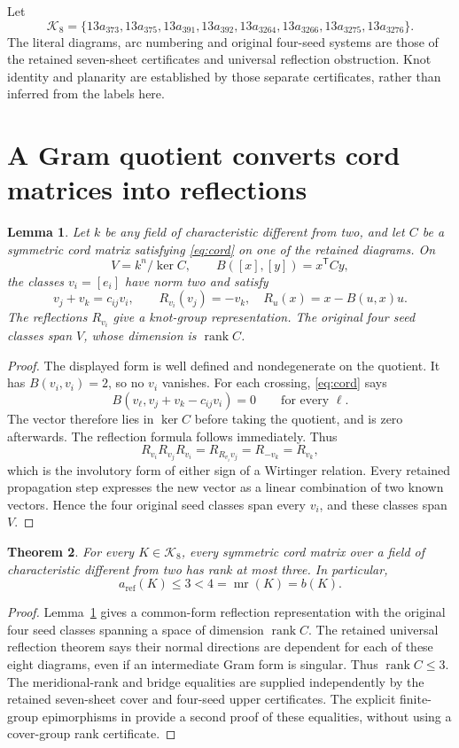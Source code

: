 \documentclass[11pt]{article}
\newtheorem{theorem}{Theorem}
\newtheorem{lemma}[theorem]{Lemma}
\newcommand{\mr}{\operatorname{mr}}
\newcommand{\rank}{\operatorname{rank}}
\begin{document}
Let
\[
\mathcal K_8=\{13a_{373},13a_{375},13a_{391},13a_{392},
13a_{3264},13a_{3266},13a_{3275},13a_{3276}\}.
\]
The literal diagrams, arc numbering and original four-seed systems are
those of the retained seven-sheet certificates and universal reflection
obstruction. Knot identity and planarity are established by those
separate certificates, rather than inferred from the labels here.

\section{A Gram quotient converts cord matrices into reflections}

\begin{lemma}\label{lem:gram}
Let $k$ be any field of characteristic different from two, and let $C$
be a symmetric cord matrix satisfying \eqref{eq:cord} on one of the
retained diagrams. On
\[
                 V=k^n/\ker C,\qquad
                 B([x],[y])=x^{\mathsf T}Cy,
\]
the classes $v_i=[e_i]$ have norm two and satisfy
\[
                   v_j+v_k=c_{ij}v_i,\qquad
                   R_{v_i}(v_j)=-v_k,
                   \quad R_u(x)=x-B(u,x)u.
\]
The reflections $R_{v_i}$ give a knot-group representation. The
original four seed classes span $V$, whose dimension is $\rank C$.
\end{lemma}
\begin{proof}
The displayed form is well defined and nondegenerate on the quotient.
It has $B(v_i,v_i)=2$, so no $v_i$ vanishes. For each crossing,
\eqref{eq:cord} says
\[
 B(v_\ell,v_j+v_k-c_{ij}v_i)=0\qquad\text{for every }\ell.
\]
The vector therefore lies in $\ker C$ before taking the quotient,
and is zero afterwards. The reflection formula follows immediately.
Thus
\[
 R_{v_i}R_{v_j}R_{v_i}=R_{R_{v_i}v_j}=R_{-v_k}=R_{v_k},
\]
which is the involutory form of either sign of a Wirtinger relation.
Every retained propagation step expresses the new vector as a linear
combination of two known vectors. Hence the four original seed
classes span every $v_i$, and these classes span $V$.
\end{proof}

\begin{theorem}\label{thm:upper}
For every $K\in\mathcal K_8$, every symmetric cord matrix over a
field of characteristic different from two has rank at most three.
In particular,
\[
                    a_{\mathrm{ref}}(K)\le3<4=\mr(K)=b(K).
\]
\end{theorem}
\begin{proof}
Lemma~\ref{lem:gram} gives a common-form reflection representation
with the original four seed classes spanning a space of dimension
$\rank C$. The retained universal reflection theorem says their normal
directions are dependent for each of these eight diagrams, even if
an intermediate Gram form is singular. Thus $\rank C\le3$.
The meridional-rank and bridge equalities are supplied independently
by the retained seven-sheet cover and four-seed upper certificates.
The explicit finite-group epimorphisms in
 provide a second proof of these
equalities, without using a cover-group rank certificate.
\end{proof}
\end{document}
